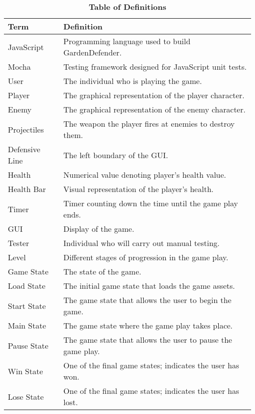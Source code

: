 \documentclass[12pt, titlepage]{article}
\begin{document}
\begin{table}[!htbp]
\caption{\textbf{Table of Definitions}} \label{Table}

\begin{tabularx}{\textwidth}{p{3cm}X}
\toprule
\textbf{Term} & \textbf{Definition}\\
\midrule
JavaScript & Programming language used to build GardenDefender.\\
Mocha & Testing framework designed for JavaScript unit tests.\\
User & The individual who is playing the game. \\
Player & The graphical representation of the player character. \\
Enemy & The graphical representation of the enemy character. \\
Projectiles & The weapon the player fires at enemies to destroy them. \\
Defensive Line & The left boundary of the GUI. \\
Health & Numerical value denoting player's health value. \\
Health Bar & Visual representation of the player's health. \\
Timer & Timer counting down the time until the game play ends. \\
GUI & Display of the game.\\
Tester & Individual who will carry out manual testing.\\
Level & Different stages of progression in the game play. \\
Game State & The state of the game. \\
Load State & The initial game state that loads the game assets. \\
Start State & The game state that allows the user to begin the game. \\
Main State & The game state where the game play takes place. \\
Pause State & The game state that allows the user to pause the game play. \\
Win State & One of the final game states; indicates the user has won. \\
Lose State & One of the final game states; indicates the user has lost. \\
\bottomrule
\end{tabularx}

\end{table}	
\end{document}
